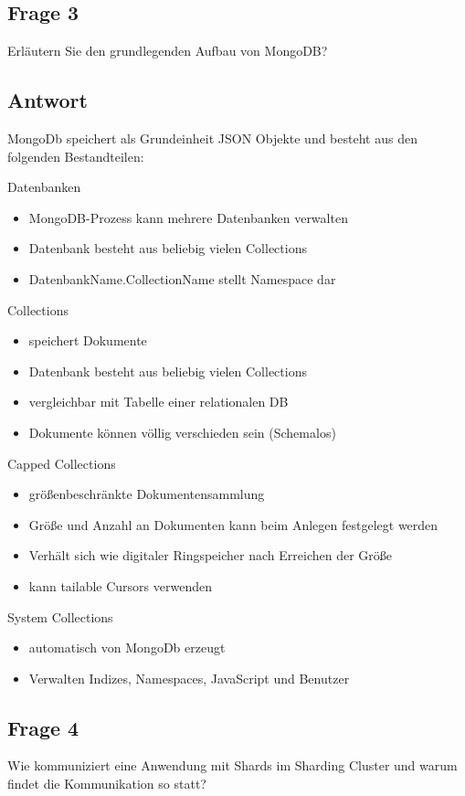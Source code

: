 \subsection*{Frage 3}
Erläutern Sie den grundlegenden Aufbau von MongoDB?
\subsection*{Antwort}
MongoDb speichert als Grundeinheit JSON Objekte und besteht aus den folgenden Bestandteilen:

Datenbanken
\begin{itemize}
	\item MongoDB-Prozess kann mehrere Datenbanken verwalten
	\item Datenbank besteht aus beliebig vielen Collections
	\item DatenbankName.CollectionName stellt Namespace dar
\end{itemize}

Collections
\begin{itemize}
	\item speichert Dokumente
	\item Datenbank besteht aus beliebig vielen Collections
	\item vergleichbar mit Tabelle einer relationalen DB
	\item Dokumente können völlig verschieden sein (Schemalos)
\end{itemize}

Capped Collections
\begin{itemize}
	\item größenbeschränkte Dokumentensammlung
	\item Größe und Anzahl an Dokumenten kann beim Anlegen festgelegt werden
	\item Verhält sich wie digitaler Ringspeicher nach Erreichen der Größe
	\item kann tailable Cursors verwenden
\end{itemize}

System Collections
\begin{itemize}
	\item automatisch von MongoDb erzeugt
	\item Verwalten Indizes, Namespaces, JavaScript und Benutzer
\end{itemize}

\subsection*{Frage 4}
Wie kommuniziert eine Anwendung mit Shards im Sharding Cluster und warum findet die Kommunikation so statt?
